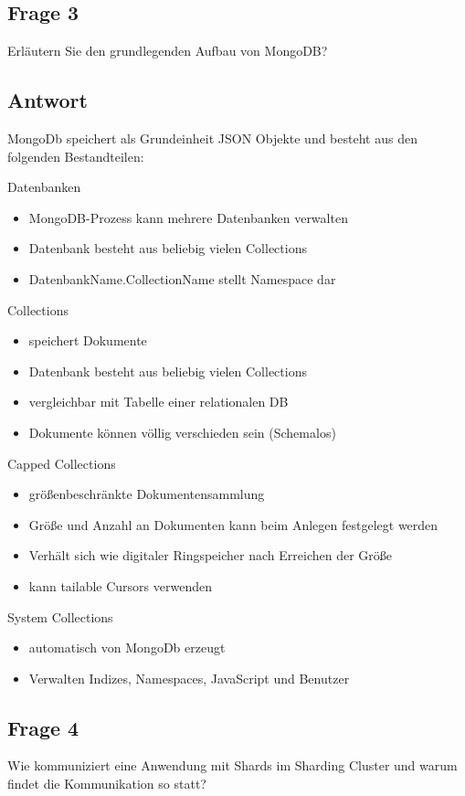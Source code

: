 \subsection*{Frage 3}
Erläutern Sie den grundlegenden Aufbau von MongoDB?
\subsection*{Antwort}
MongoDb speichert als Grundeinheit JSON Objekte und besteht aus den folgenden Bestandteilen:

Datenbanken
\begin{itemize}
	\item MongoDB-Prozess kann mehrere Datenbanken verwalten
	\item Datenbank besteht aus beliebig vielen Collections
	\item DatenbankName.CollectionName stellt Namespace dar
\end{itemize}

Collections
\begin{itemize}
	\item speichert Dokumente
	\item Datenbank besteht aus beliebig vielen Collections
	\item vergleichbar mit Tabelle einer relationalen DB
	\item Dokumente können völlig verschieden sein (Schemalos)
\end{itemize}

Capped Collections
\begin{itemize}
	\item größenbeschränkte Dokumentensammlung
	\item Größe und Anzahl an Dokumenten kann beim Anlegen festgelegt werden
	\item Verhält sich wie digitaler Ringspeicher nach Erreichen der Größe
	\item kann tailable Cursors verwenden
\end{itemize}

System Collections
\begin{itemize}
	\item automatisch von MongoDb erzeugt
	\item Verwalten Indizes, Namespaces, JavaScript und Benutzer
\end{itemize}

\subsection*{Frage 4}
Wie kommuniziert eine Anwendung mit Shards im Sharding Cluster und warum findet die Kommunikation so statt?
